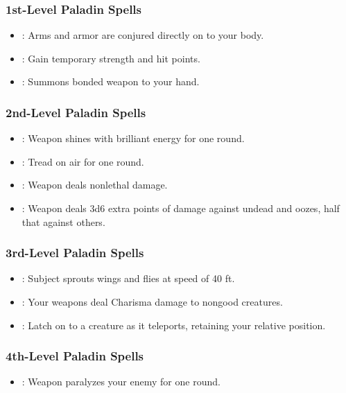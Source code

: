 \subsubsection{1st-Level Paladin Spells}
\begin{itemize}
 \item {}: Arms and armor are conjured directly on to your body.
 \item {}: Gain temporary strength and hit points.
 \item {}: Summons bonded weapon to your hand.
\end{itemize}
\subsubsection{2nd-Level Paladin Spells}
\begin{itemize}
 \item {}: Weapon shines with brilliant energy for one round.
 \item {}: Tread on air for one round.
 \item {}: Weapon deals nonlethal damage.
 \item {}: Weapon deals 3d6 extra points of damage against undead and oozes, half that against others.
\end{itemize}
\subsubsection{3rd-Level Paladin Spells}
\begin{itemize}
 \item {}: Subject sprouts wings and flies at speed of 40 ft.
 \item {}: Your weapons deal Charisma damage to nongood creatures.
 \item {}: Latch on to a creature as it teleports, retaining your relative position.
\end{itemize}
\subsubsection{4th-Level Paladin Spells}
\begin{itemize}
 \item {}: Weapon paralyzes your enemy for one round.
\end{itemize}
